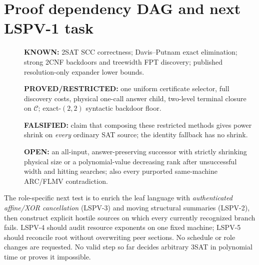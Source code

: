 \documentclass[11pt]{article}
\begin{document}
\section{Proof dependency DAG and next LSPV-1 task}
\begin{description}
\item[] \textbf{KNOWN:} 2SAT SCC correctness; Davis--Putnam exact elimination; strong 2CNF backdoors and treewidth FPT discovery; published resolution-only expander lower bounds.
\item[] \textbf{PROVED/RESTRICTED:} one uniform certificate selector, full discovery costs, physical one-call answer child, two-level terminal closure on $\mathcal C$; exact-$(2,2)$ syntactic backdoor floor.
\item[] \textbf{FALSIFIED:} claim that composing these restricted methods gives power shrink on \emph{every} ordinary SAT source; the identity fallback has no shrink.
\item[] \textbf{OPEN:} an all-input, answer-preserving successor with strictly shrinking physical size or a polynomial-value decreasing rank after unsuccessful width and hitting searches; also every purported same-machine ARC/FLMV contradiction.
\end{description}
The role-specific next test is to enrich the leaf language with \emph{authenticated affine/XOR cancellation} (LSPV-3) and moving structural summaries (LSPV-2), then construct explicit hostile sources on which every currently recognized branch fails. LSPV-4 should audit resource exponents on one fixed machine; LSPV-5 should reconcile root  without overwriting peer sections. No schedule or role changes are requested. No valid step so far decides arbitrary 3SAT in polynomial time or proves it impossible.


\end{document}
